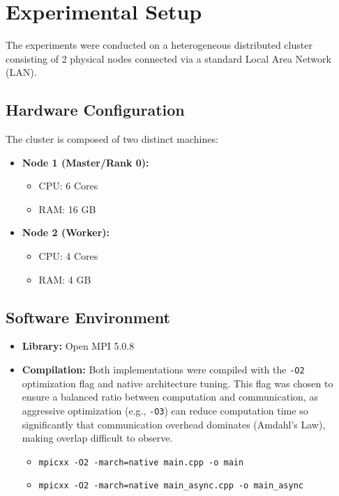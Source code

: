 \documentclass[12pt]{article}
\begin{document}
\section{Experimental Setup}

The experiments were conducted on a heterogeneous distributed cluster consisting of 2 physical nodes connected via a standard Local Area Network (LAN).

\subsection{Hardware Configuration}
The cluster is composed of two distinct machines:
\begin{itemize}
    \item \textbf{Node 1 (Master/Rank 0):}
    \begin{itemize}
        \item CPU: 6 Cores
        \item RAM: 16 GB
    \end{itemize}
    \item \textbf{Node 2 (Worker):}
    \begin{itemize}
        \item CPU: 4 Cores
        \item RAM: 4 GB
    \end{itemize}
\end{itemize}

\subsection{Software Environment}
\begin{itemize}
    \item \textbf{Library:} Open MPI 5.0.8
    \item \textbf{Compilation:} Both implementations were compiled with the \texttt{-O2} optimization flag and native architecture tuning. This flag was chosen to ensure a balanced ratio between computation and communication, as aggressive optimization (e.g., \texttt{-O3}) can reduce computation time so significantly that communication overhead dominates (Amdahl's Law), making overlap difficult to observe.
    \begin{itemize}
        \item \texttt{mpicxx -O2 -march=native main.cpp -o main}
        \item \texttt{mpicxx -O2 -march=native main\_async.cpp -o main\_async}
    \end{itemize}
\end{itemize}
\end{document}
